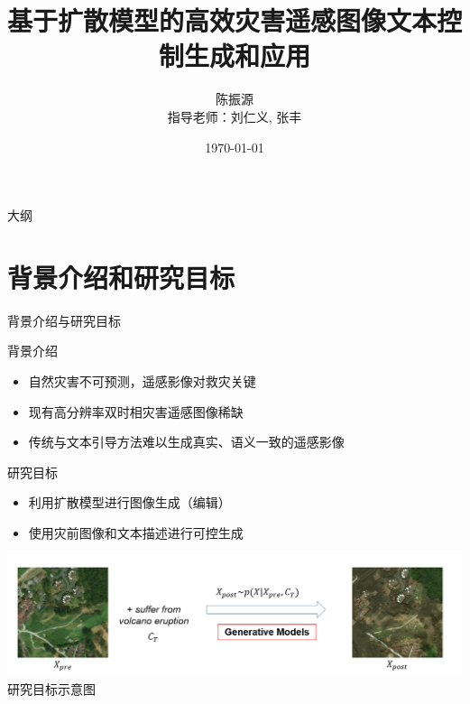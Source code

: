\documentclass[11pt,aspectratio=169]{beamer}
\author[陈振源]{陈振源 \\ 指导老师：刘仁义, 张丰}
\title{基于扩散模型的高效灾害遥感图像文本控制生成和应用}
\institute[]{浙江大学地球科学学院}
\date{\today}
\begin{document}
\begin{frame}
\titlepage
\end{frame}

\begin{frame}{大纲}
\tableofcontents 
\end{frame}

\section{背景介绍和研究目标}
\begin{frame}{背景介绍与研究目标}
\begin{block}{背景介绍}
    \begin{itemize}
        \item 自然灾害不可预测，遥感影像对救灾关键
        \item 现有高分辨率双时相灾害遥感图像稀缺
        \item 传统与文本引导方法难以生成真实、语义一致的遥感影像
    \end{itemize}
\end{block}
\begin{block}{研究目标}
    \begin{itemize}
        \item 利用扩散模型进行图像生成（编辑）
        \item 使用灾前图像和文本描述进行可控生成
    \end{itemize}
    \begin{center}
        \includegraphics[width=0.5\linewidth]{imagens/diffusion_editing.png}\\
        \small 研究目标示意图
    \end{center}
\end{block}
\end{frame}
\end{document}
